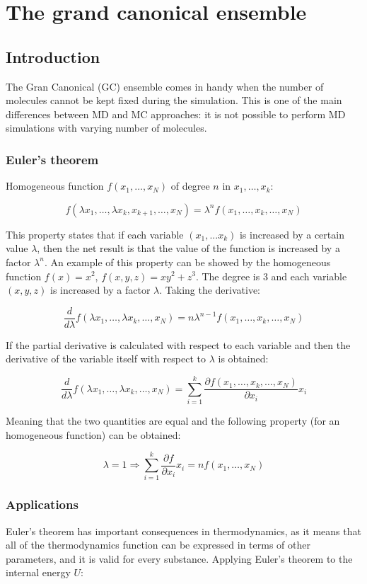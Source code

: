 \graphicspath{{chapters/13/images/}}
\chapter{The grand canonical ensemble}

\section{Introduction}
The Gran Canonical (GC) ensemble comes in handy when the number of molecules cannot be kept fixed during the simulation.
This is one of the main differences between MD and MC approaches: it is not possible to perform MD simulations with varying number of molecules.

	\subsection{Euler's theorem}
	Homogeneous function $f(x_1, \dots, x_N)$ of degree $n$ in $x_1, \dots, x_k$:

	$$f(\lambda x_1, \dots, \lambda x_k, x_{k+1}, \dots, x_N) = \lambda^n f(x_1, \dots, x_k, \dots, x_N)$$

	This property states that if each variable $(x_1, ... x_k)$ is increased by a certain value $\lambda$, then the net result is that the value of the function is increased by a factor $\lambda^n$.
	An example of this property can be showed by the homogeneous function $f(x) = x^2$, $f(x, y, z) = xy^2+z^3$.
	The degree is $3$ and each variable $(x, y, z)$ is increased by a factor $\lambda$.
	Taking the derivative:

	$$\frac{d}{d\lambda} f(\lambda x_1, \dots, \lambda x_k, \dots, x_N) = n\lambda^{n-1}f(x_1, \dots, x_k,\dots, x_N)$$

	If the partial derivative is calculated with respect to each variable and then the derivative of the variable itself with respect to $\lambda$ is obtained:

	$$\frac{d}{d\lambda}f(\lambda x_1, \dots, \lambda x_k, \dots, x_N) = \sum\limits_{i=1}^k\frac{\partial f(x_1, \dots, x_k, \dots, x_N)}{\partial x_i}x_i$$

	Meaning that the two quantities are equal and the following property (for an homogeneous function) can be obtained:

	$$\lambda = 1 \Rightarrow \sum\limits_{i=1}^k\frac{\partial f}{\partial x_i}x_i = nf(x_1, \dots, x_N)$$

	\subsection{Applications}
	Euler's theorem has important consequences in thermodynamics, as it means that all of the thermodynamics function can be expressed in terms of other parameters, and it is valid for every substance.
	Applying Euler's theorem to the internal energy $U$:

